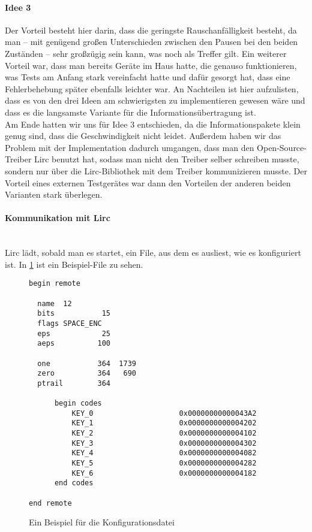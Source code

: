 \paragraph{Idee 3}
Der Vorteil besteht hier darin, dass die geringste Rauschanfälligkeit besteht, da man – mit genügend
großen Unterschieden zwischen den Pausen bei den beiden Zuständen – sehr großzügig sein kann, was
noch als Treffer gilt.
Ein weiterer Vorteil war, dass man bereits Geräte im Haus hatte, die genauso funktionieren, was
Tests am Anfang stark vereinfacht hatte und dafür gesorgt hat, dass eine Fehlerbehebung später
ebenfalls leichter war.
An Nachteilen ist hier aufzulisten, dass es von den drei Ideen am schwierigsten zu implementieren
gewesen wäre und dass es die langsamste Variante für die Informationsübertragung ist. \\

Am Ende hatten wir uns für Idee 3 entschieden, da die Informationspakete klein genug sind, dass
die Geschwindigkeit nicht leidet.
Außerdem haben wir das Problem mit der Implementation dadurch umgangen, dass man den
Open-Source-Treiber Lirc benutzt hat, sodass man nicht den Treiber selber schreiben musste, sondern
nur über die Lirc-Bibliothek mit dem Treiber kommunizieren musste.
Der Vorteil eines externen Testgerätes war dann den Vorteilen der anderen beiden Varianten stark
überlegen.

\paragraph{Kommunikation mit Lirc} \mbox{} \\
\noindent
Lirc lädt, sobald man es startet, ein File, aus dem es ausliest, wie es konfiguriert ist.
In \cref{fig:lirc-conf} ist ein Beispiel-File zu sehen.
\begin{figure}[h]
  \centering
  \begin{lstlisting}[basicstyle=\scriptsize\tt,frame=single,
                     xleftmargin=.15\textwidth,xrightmargin=.15\textwidth]
begin remote

  name  12		   	
  bits           15  		
  flags SPACE_ENC			 	
  eps            25
  aeps          100

  one           364  1739
  zero          364   690
  ptrail        364

      begin codes
          KEY_0                    0x00000000000043A2        
          KEY_1                    0x0000000000004202        
          KEY_2                    0x0000000000004102        
          KEY_3                    0x0000000000004302        
          KEY_4                    0x0000000000004082       
          KEY_5                    0x0000000000004282        
          KEY_6                    0x0000000000004182        
      end codes

end remote
  \end{lstlisting}
  \caption{Ein Beispiel für die Konfigurationsdatei}
  \label{fig:lirc-conf}
\end{figure}

